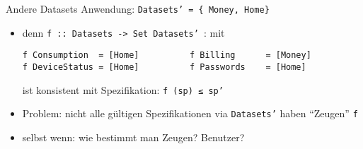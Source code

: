 \documentclass[18pt]{beamer}
\newcommand{\kit}[1]{\textcolor{kit-green100}{#1}}
\begin{document}
\begin{frame}[fragile]{Andere Datasets}
\kit{Anwendung:} \texttt{Datasets' = \{ Money, Home\}}

\begin{overprint}
\begin{center}
\end{center}

\begin{center}
\end{center}

\begin{center}
\end{center}

\begin{center}
\end{center}


\begin{center}
\end{center}


\end{overprint}

\begin{overprint}
\begin{itemize}
  \item denn \texttt{f :: Datasets -> Set Datasets' }: mit
\begin{verbatim}
f Consumption  = [Home]          f Billing      = [Money]
f DeviceStatus = [Home]          f Passwords    = [Home]
\end{verbatim}
        ist konsistent mit Spezifikation: \texttt{f (sp) ≤ sp'}
\end{itemize}

\begin{itemize}
  \item Problem: nicht alle gültigen Spezifikationen via \texttt{Datasets'} haben \enquote{Zeugen} \texttt{f}
  \item selbst wenn: wie bestimmt man Zeugen? Benutzer?
\end{itemize}


\end{overprint}
\end{frame}
\end{document}
